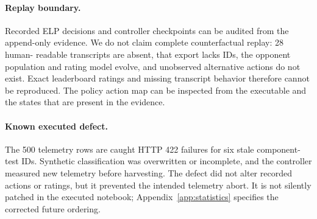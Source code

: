 \paragraph{Replay boundary.}
Recorded ELP decisions and controller checkpoints can be audited from the
append-only evidence. We do not claim complete counterfactual replay: 28 human-
readable transcripts are absent, that export lacks IDs, the opponent population
and rating model evolve, and unobserved alternative actions do not exist.
Exact leaderboard ratings and missing transcript behavior therefore cannot be
reproduced. The policy action map can be inspected from the executable and the
states that are present in the evidence.

\paragraph{Known executed defect.}
The 500 telemetry rows are caught HTTP 422 failures for six stale component-test
IDs. Synthetic classification was overwritten or incomplete, and the controller
measured new telemetry before harvesting. The defect did not alter recorded
actions or ratings, but it prevented the intended telemetry abort. It is not
silently patched in the executed notebook; Appendix~\ref{app:statistics}
specifies the corrected future ordering.
